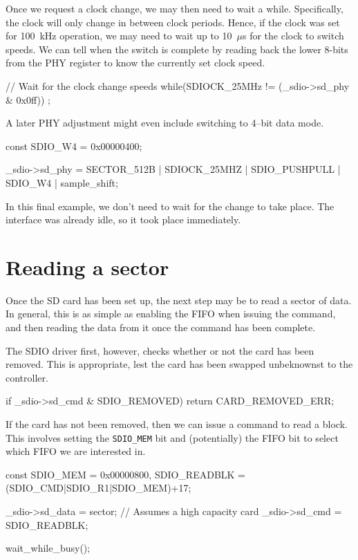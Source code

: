 \documentclass{gqtekspec}
\begin{document}
Once we request a clock change, we may then need to wait a while.  Specifically,
the clock will only change in between clock periods.  Hence, if the clock was
set for 100~kHz operation, we may need to wait up to 10~$\mu$s for the clock
to switch speeds.  We can tell when the switch is complete by reading back
the lower 8-bits from the PHY register to know the currently set clock speed.

\begin{zCpp}
	// Wait for the clock change speeds
	while(SDIOCK_25MHz != (_sdio->sd_phy & 0x0ff))
		;
\end{zCpp}

A later PHY adjustment might even include switching to 4--bit data mode.

\begin{zCpp}
	const	SDIO_W4 = 0x00000400;

	_sdio->sd_phy = SECTOR_512B | SDIOCK_25MHZ | SDIO_PUSHPULL
				| SDIO_W4 | sample_shift;
\end{zCpp}

In this final example, we don't need to wait for the change to take place.
The interface was already idle, so it took place immediately.
\section{Reading a sector}
Once the SD card has been set up, the next step may be to read a sector
of data.  In general, this is as simple as enabling the FIFO when issuing
the command, and then reading the data from it once the command has been
complete.

The SDIO driver first, however, checks whether or not the card has been
removed.  This is appropriate, lest the card has been swapped unbeknownst
to the controller.
\begin{zCpp}
	if _sdio->sd_cmd & SDIO_REMOVED)
		return CARD_REMOVED_ERR;
\end{zCpp}

If the card has not been removed, then we can issue a command to read a
block.  This involves setting the {\tt SDIO\_MEM} bit and (potentially) the
FIFO bit to select which FIFO we are interested in.
\begin{zCpp}
	const	SDIO_MEM     = 0x00000800,
		SDIO_READBLK = (SDIO_CMD|SDIO_R1|SDIO_MEM)+17;

	_sdio->sd_data = sector;	// Assumes a high capacity card
	_sdio->sd_cmd = SDIO_READBLK;

	wait_while_busy();
\end{zCpp}
\end{document}
